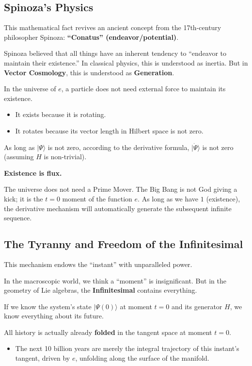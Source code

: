 \documentclass[11pt,a4paper,twoside]{book}
\begin{document}
\subsection{Spinoza's Physics}

This mathematical fact revives an ancient concept from the 17th-century philosopher Spinoza: \textbf{``Conatus'' (endeavor/potential)}.

Spinoza believed that all things have an inherent tendency to ``endeavor to maintain their existence.'' In classical physics, this is understood as inertia. But in \textbf{Vector Cosmology}, this is understood as \textbf{Generation}.

In the universe of $e$, a particle does not need external force to maintain its existence.

\begin{itemize}
\item It exists because it is rotating.

\item It rotates because its vector length in Hilbert space is not zero.
\end{itemize}

As long as $|\Psi\rangle$ is not zero, according to the derivative formula, $|\dot{\Psi}\rangle$ is not zero (assuming $H$ is non-trivial).

\textbf{Existence is flux.}

The universe does not need a Prime Mover. The Big Bang is not God giving a kick; it is the $t=0$ moment of the function $e$. As long as we have $1$ (existence), the derivative mechanism will automatically generate the subsequent infinite sequence.

\subsection{The Tyranny and Freedom of the Infinitesimal}

This mechanism endows the ``instant'' with unparalleled power.

In the macroscopic world, we think a ``moment'' is insignificant. But in the geometry of Lie algebras, the \textbf{Infinitesimal} contains everything.

If we know the system's state $|\Psi(0)\rangle$ at moment $t=0$ and its generator $H$, we know everything about its future.

All history is actually already \textbf{folded} in the tangent space at moment $t=0$.

\begin{itemize}
\item The next 10 billion years are merely the integral trajectory of this instant's tangent, driven by $e$, unfolding along the surface of the manifold.
\end{itemize}
\end{document}
